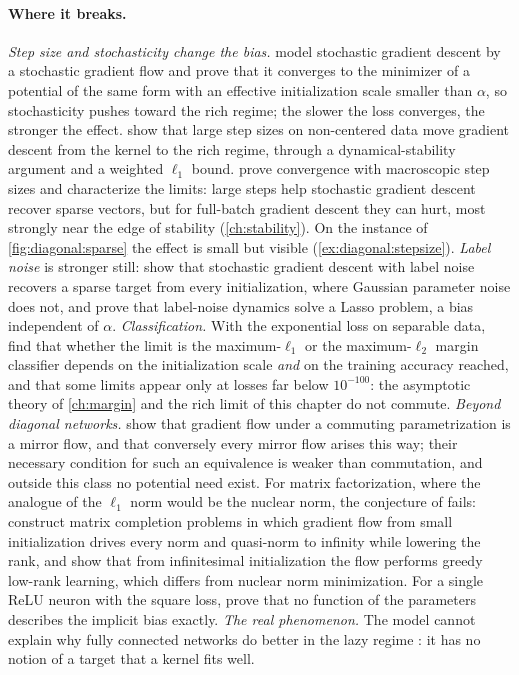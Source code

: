 \begin{refsection}
\paragraph{Where it breaks.} \emph{Step size and stochasticity change the bias.} \Textcite{PesmePillaudVivienFlammarion2021} model stochastic gradient descent by a stochastic gradient flow and prove that it converges to the minimizer of a potential of the same form with an effective initialization scale smaller than $\alpha$, so stochasticity pushes toward the rich regime; the slower the loss converges, the stronger the effect. \Textcite{NacsonEtAl2022} show that large step sizes on non-centered data move gradient descent from the kernel to the rich regime, through a dynamical-stability argument and a weighted $\ell_1$ bound. \Textcite{EvenEtAl2023} prove convergence with macroscopic step sizes and characterize the limits: large steps help stochastic gradient descent recover sparse vectors, but for full-batch gradient descent they can hurt, most strongly near the edge of stability (\cref{ch:stability}). On the instance of \cref{fig:diagonal:sparse} the effect is small but visible (\cref{ex:diagonal:stepsize}). \emph{Label noise} is stronger still: \textcite{HaoChenEtAl2021} show that stochastic gradient descent with label noise recovers a sparse target from every initialization, where Gaussian parameter noise does not, and \textcite{PillaudVivienReygnerFlammarion2022} prove that label-noise dynamics solve a Lasso problem, a bias independent of $\alpha$. \emph{Classification.} With the exponential loss on separable data, \textcite{MoroshkoEtAl2020} find that whether the limit is the maximum-$\ell_1$ or the maximum-$\ell_2$ margin classifier depends on the initialization scale \emph{and} on the training accuracy reached, and that some limits appear only at losses far below $10^{-100}$: the asymptotic theory of \cref{ch:margin} and the rich limit of this chapter do not commute. \emph{Beyond diagonal networks.} \Textcite{LiWangLeeArora2022} show that gradient flow under a commuting parametrization is a mirror flow, and that conversely every mirror flow arises this way; their necessary condition for such an equivalence is weaker than commutation, and outside this class no potential need exist. For matrix factorization, where the analogue of the $\ell_1$ norm would be the nuclear norm, the conjecture of \textcite{GunasekarEtAl2017} fails: \textcite{RazinCohen2020} construct matrix completion problems in which gradient flow from small initialization drives every norm and quasi-norm to infinity while lowering the rank, and \textcite{LiLuoLyu2021} show that from infinitesimal initialization the flow performs greedy low-rank learning, which differs from nuclear norm minimization. For a single ReLU neuron with the square loss, \textcite{VardiShamir2021} prove that no function of the parameters describes the implicit bias exactly. \emph{The real phenomenon.} The model cannot explain why fully connected networks do better in the lazy regime \parencite{GeigerEtAl2020}: it has no notion of a target that a kernel fits well.


\end{refsection}
